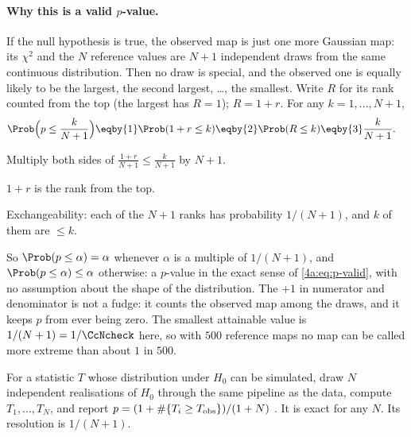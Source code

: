 \paragraph{Why this is a valid $p$-value.} If the null hypothesis is true, the observed map is just one more Gaussian map:
its $\chi^2$ and the $N$ reference values are $N+1$ independent draws from the same continuous distribution. Then no draw is
special, and the observed one is equally likely to be the largest, the second largest, \ldots, the smallest. Write $R$ for
its rank counted from the top (the largest has $R=1$); $R=1+r$. For any $k=1,\dots,N+1$,
\begin{align}
  \Prob\Bigl(p\le\frac{k}{N+1}\Bigr)
  &\eqby{1}\Prob(1+r\le k)
   \eqby{2}\Prob(R\le k)
   \eqby{3}\frac{k}{N+1} .
  \label{12c:eq:psim-valid}
\end{align}
\begin{explain}
  \item Multiply both sides of $\frac{1+r}{N+1}\le\frac k{N+1}$ by $N+1$.
  \item $1+r$ is the rank from the top.
  \item Exchangeability: each of the $N+1$ ranks has probability $1/(N+1)$, and $k$ of them are $\le k$.
\end{explain}
So $\Prob(p\le\alpha)=\alpha$ whenever $\alpha$ is a multiple of $1/(N+1)$, and $\Prob(p\le\alpha)\le\alpha$ otherwise: a
$p$-value in the exact sense of \eqref{4a:eq:p-valid}, with no assumption about the shape of the distribution. The $+1$ in
numerator and denominator is not a fudge: it counts the observed map among the draws, and it keeps $p$ from ever being
zero. The smallest attainable value is $1/(N+1)=1/\CcNcheck$ here, so with $500$ reference maps no map can be called
more extreme than about $1$ in $500$.

\begin{workdef}
For a statistic $T$ whose distribution under $H_0$ can be simulated, draw $N$ independent realisations of $H_0$ through the
same pipeline as the data, compute $T_1,\dots,T_N$, and report $p=(1+\#\{T_i\ge T_{\rm obs}\})/(1+N)$
. It is exact for any $N$.
Its resolution is $1/(N+1)$.
\end{workdef}

